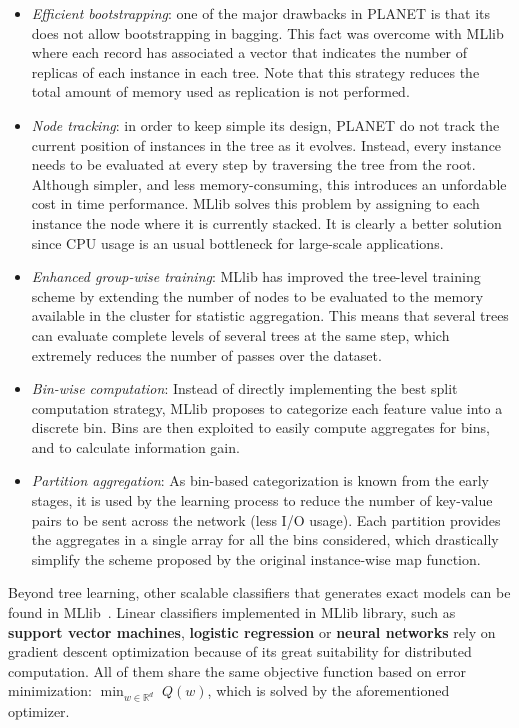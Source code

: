 \documentclass[3p,review]{elsarticle}
\begin{document}
\begin{itemize}
	\item \textit{Efficient bootstrapping}: one of the major drawbacks in PLANET is that its does not allow bootstrapping in bagging. This fact was overcome with MLlib where each record has associated a vector that indicates the number of replicas of each instance in each tree. Note that this strategy reduces the total amount of memory used as replication is not performed.
	\item \textit{Node tracking}: in order to keep simple its design, PLANET do not track the current position of instances in the tree as it evolves. Instead, every instance needs to be evaluated at every step by traversing the tree from the root. Although simpler, and less memory-consuming, this introduces an unfordable cost in time performance. MLlib solves this problem by assigning to each instance the node where it is currently stacked. It is clearly a better solution since CPU usage is an usual bottleneck for large-scale applications.
	\item \textit{Enhanced group-wise training}: MLlib has improved the tree-level training scheme by extending the number of nodes to be evaluated to the memory available in the cluster for statistic aggregation. This means that several trees can evaluate complete levels of several trees at the same step, which extremely reduces the number of passes over the dataset.
	\item \textit{Bin-wise computation}: Instead of directly implementing the best split computation strategy, MLlib proposes to categorize each feature value into a discrete bin. Bins are then exploited to easily compute aggregates for bins, and to calculate information gain. 
	 \item \textit{Partition aggregation}: As bin-based categorization is known from the early stages, it is used by the learning process to reduce the number of key-value pairs to be sent across the network (less I/O usage). Each partition provides the aggregates in a single array for all the bins considered, which drastically simplify the scheme proposed by the original instance-wise map function.
\end{itemize}

Beyond tree learning, other scalable classifiers that generates exact models can be found in MLlib~\cite{mllibguide}. Linear classifiers implemented in MLlib library, such as \textbf{support vector machines}, \textbf{logistic regression} or \textbf{neural networks} rely on gradient descent optimization because of its great suitability for distributed computation. All of them share the same objective function based on error minimization: $\min_{w \in \mathbb{R}^d} \; Q(w)$, which is solved by the aforementioned optimizer.
\end{document}
